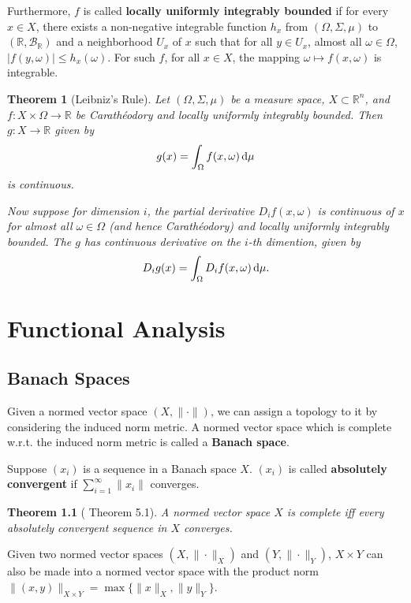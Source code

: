\documentclass[openany]{book}
\newtheorem{theorem}{Theorem}[chapter]
\theoremstyle{definition}
\theoremstyle{remark}
\begin{document}
Furthermore, $f$ is called \textbf{locally uniformly integrably bounded} if for every $x\in X$, there exists a non-negative integrable function $h_x$ from $(\Omega,\Sigma,\mu)$ to $(\mathbb{R},\mathcal{B}_{\mathbb{R}})$ and a neighborhood $U_x$ of $x$ such that for all $y\in U_x$, almost all $\omega\in\Omega$, $|f(y,\omega)|\le h_x(\omega)$. For such $f$, for all $x\in X$, the mapping $\omega\mapsto f(x,\omega)$ is integrable.
\begin{theorem}[Leibniz's Rule]
    Let $(\Omega,\Sigma,\mu)$ be a measure space, $X\subset \mathbb{R}^n$, and $f:X\times\Omega\to \mathbb{R}$ be Carath\'{e}odory and locally uniformly integrably bounded. Then $g:X\to \mathbb{R}$ given by
    \begin{equation*}
        g(x)=\int_{\Omega} f(x,\omega)\dif\mu
    \end{equation*}
    is continuous.

    Now suppose for dimension $i$, the partial derivative $D_if(x,\omega)$ is continuous of $x$ for almost all $\omega\in\Omega$ (and hence Carath\'{e}odory) and locally uniformly integrably bounded. The $g$ has continuous derivative on the $i$-th dimention, given by
    \begin{equation*}
        D_ig(x)=\int_{\Omega}D_if(x,\omega)\dif\mu.
    \end{equation*}
\end{theorem}

\chapter{Functional Analysis} %
\section{Banach Spaces}
Given a normed vector space $(X,\|\cdot\|)$, we can assign a topology to it by considering the induced norm metric. A normed vector space which is complete w.r.t. the induced norm metric is called a \textbf{Banach space}.

Suppose $(x_i)$ is a sequence in a Banach space $X$. $(x_i)$ is called \textbf{absolutely convergent} if $\sum_{i=1}^{\infty}\|x_i\|$ converges.
\begin{theorem}[\cite{F13} Theorem 5.1]
    A normed vector space $X$ is complete iff every absolutely convergent sequence in $X$ converges.
\end{theorem}

Given two normed vector spaces $(X,\|\cdot\|_X)$ and $(Y,\|\cdot\|_Y)$, $X\times Y$ can also be made into a normed vector space with the product norm $\|(x,y)\|_{X\times Y}=\max\{\|x\|_X,\|y\|_Y\}$.
\end{document}
